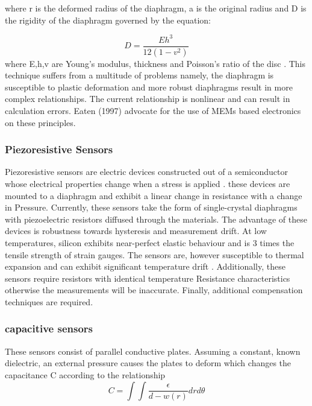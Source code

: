 where r is the deformed radius of the diaphragm, a is the original radius and D is the  rigidity of the diaphragm governed by the equation:

\begin{equation}
	D = \frac{Eh^3}{12(1-v^2)}
\end{equation}
where E,h,v are Young's modulus, thickness and Poisson's ratio of the disc \cite{eaton1997micromachined}. This technique suffers from a multitude of problems namely, the diaphragm is susceptible to plastic deformation and more robust diaphragms result in more complex relationships. The current relationship is nonlinear and can result in calculation errors. Eaten (1997) advocate for the use of MEMs based electronics on these principles.

\subsubsection{Piezoresistive Sensors}

Piezoresistive sensors are electric devices constructed out of a semiconductor whose electrical properties change when a stress is applied \cite{eaton1997micromachined}. these devices are mounted to a diaphragm and exhibit a linear change in resistance with a change in Pressure. Currently, these sensors take the form of single-crystal diaphragms with piezoelectric resistors diffused through the materials. The advantage of these devices is robustness towards hysteresis and measurement drift. At low temperatures, silicon exhibits near-perfect elastic behaviour and is  3 times the tensile strength of strain gauges\cite{eaton1997micromachined}. The sensors are, however susceptible to thermal expansion and can exhibit significant temperature drift \cite{samaun1971ic}. Additionally, these sensors require resistors with identical temperature Resistance characteristics otherwise the measurements will be inaccurate. Finally, additional compensation techniques are required.

\subsubsection{capacitive sensors}

These sensors consist of parallel conductive plates. Assuming a constant, known dielectric, an external pressure causes the plates to deform which changes the capacitance C according to the relationship \cite{eaton1997micromachined}
\begin{equation}
	C = \int \int \frac{\epsilon}{d - w(r)}drd\theta
\end{equation}

